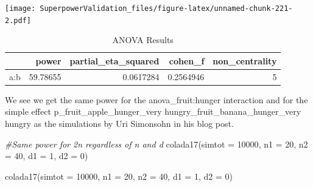 \documentclass[
]{book}
\newenvironment{Shaded}{\begin{snugshade}}{\end{snugshade}}
\newcommand{\AttributeTok}[1]{\textcolor[rgb]{0.77,0.63,0.00}{#1}}
\newcommand{\CommentTok}[1]{\textcolor[rgb]{0.56,0.35,0.01}{\textit{#1}}}
\newcommand{\ConstantTok}[1]{\textcolor[rgb]{0.00,0.00,0.00}{#1}}
\newcommand{\DecValTok}[1]{\textcolor[rgb]{0.00,0.00,0.81}{#1}}
\newcommand{\FloatTok}[1]{\textcolor[rgb]{0.00,0.00,0.81}{#1}}
\newcommand{\FunctionTok}[1]{\textcolor[rgb]{0.00,0.00,0.00}{#1}}
\newcommand{\NormalTok}[1]{#1}
\newcommand{\OtherTok}[1]{\textcolor[rgb]{0.56,0.35,0.01}{#1}}
\newcommand{\SpecialCharTok}[1]{\textcolor[rgb]{0.00,0.00,0.00}{#1}}
\newcommand{\StringTok}[1]{\textcolor[rgb]{0.31,0.60,0.02}{#1}}
\begin{document}
\texttt{[image: SuperpowerValidation\_files/figure-latex/unnamed-chunk-221-2.pdf]}

\begin{Shaded}
\end{Shaded}

\begin{table}[!h]

\caption{\label{tab:unnamed-chunk-221}ANOVA Results}
\centering
\begin{tabular}[t]{l|r|r|r|r}
\hline
  & power & partial\_eta\_squared & cohen\_f & non\_centrality\\
\hline
a:b & 59.78655 & 0.0617284 & 0.2564946 & 5\\
\hline
\end{tabular}
\end{table}

We see we get the same power for the anova\_fruit:hunger interaction and for the simple effect p\_fruit\_apple\_hunger\_very hungry\_fruit\_banana\_hunger\_very hungry as the simulations by Uri Simonsohn in his blog post.

\begin{Shaded}
\begin{Highlighting}[]
\CommentTok{\#Same power for 2n regardless of n and d}
\FunctionTok{colada17}\NormalTok{(}\AttributeTok{simtot =} \DecValTok{10000}\NormalTok{, }\AttributeTok{n1 =} \DecValTok{20}\NormalTok{, }\AttributeTok{n2 =} \DecValTok{40}\NormalTok{, }\AttributeTok{d1 =} \DecValTok{1}\NormalTok{, }\AttributeTok{d2 =} \DecValTok{0}\NormalTok{)  }

\FunctionTok{colada17}\NormalTok{(}\AttributeTok{simtot =} \DecValTok{10000}\NormalTok{, }\AttributeTok{n1 =} \DecValTok{20}\NormalTok{, }\AttributeTok{n2 =} \DecValTok{40}\NormalTok{, }\AttributeTok{d1 =} \DecValTok{1}\NormalTok{, }\AttributeTok{d2 =} \DecValTok{0}\NormalTok{) }
\end{Highlighting}
\end{Shaded}
\end{document}
